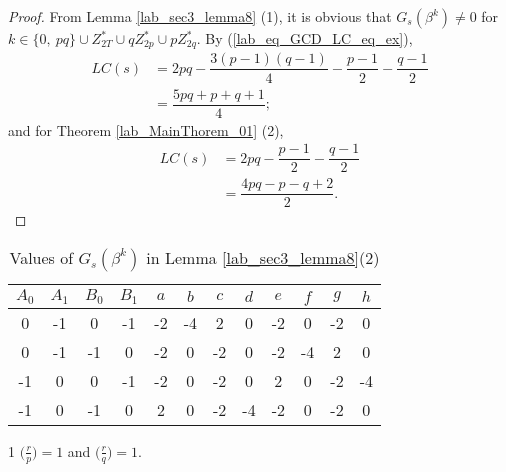 \documentclass{mcom-l}
\theoremstyle{definition}
\numberwithin{equation}{section}
\begin{document}
\begin{proof}
       From Lemma \ref{lab_sec3_lemma8} (1), it is obvious that $ G_{s}(\beta^{k})\ne 0 $ for $ k\in \lbrace 0,\ pq \rbrace \cup Z^{*}_{2T}\cup qZ^{*}_{2p}\cup pZ^{*}_{2q} $. By (\ref{lab_eq_GCD_LC_eq_ex}), 
       \begin{equation*}
       \begin{split}
       LC(s)&=2pq-\dfrac{3(p-1)(q-1)}{4}-\dfrac{p-1}{2}-\dfrac{q-1}{2}\\
            &=\dfrac{5pq+p+q+1}{4};
        \end{split}
       \end{equation*}
       and for Theorem \ref{lab_MainThorem_01} (2),
       \begin{equation*}
          \begin{split}
          LC(s)&=2pq-\dfrac{p-1}{2}-\dfrac{q-1}{2}\\
               &=\dfrac{4pq-p-q+2}{2}.
           \end{split}
          \end{equation*}
\end{proof}
      \begin{table}[!t]
       \begin{threeparttable}[t]
       \renewcommand{\arraystretch}{1.3}
       \caption{Values of $ G_{s}(\beta^{k})$ in Lemma \ref{lab_sec3_lemma8}(2)
       \label{Lab_Table1}}
       \centering
       \begin{tabular}{c|c|c|c|c|c|c|c|c|c|c|c}
       \hline
      $ A_{0} $ & $ A_{1} $ & $ B_{0} $ & $ B_{1} $ & $ a $ & $ b $ & $ c $ & $ d $ & $ e $ & $ f $ & $ g $ & $ h $\\
       \hline
       0 & -1 & 0 & -1 & -2 & -4 & 2 & 0 & -2 & 0 & -2 & 0\\
       \hline
       0 & -1 & -1 & 0 & -2 &  0 & -2 & 0 & -2 & -4 & 2 & 0\\
       \hline
       -1 & 0 & 0 & -1 & -2 &  0 & -2 & 0 & 2 & 0 & -2 & -4\\
       \hline
       -1 & 0 & -1 & 0 & 2 &  0 & -2 & -4 & -2 & 0 & -2 & 0\\
       \hline
       \end{tabular}
        \begin{tablenotes}
                   \item [1] $ \bigl(\tfrac{r}{p}\bigr) =1 $ and $ \bigl(\tfrac{r}{q}\bigr) =1 $.
        \end{tablenotes}
       \end{threeparttable}
       \end{table}
\end{document}
